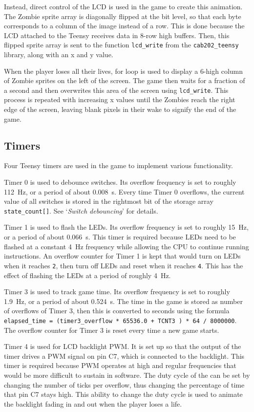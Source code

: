 \documentclass[10pt, titlepage]{article}
\begin{document}
Instead, direct control of the LCD is used in the game to create this animation. The Zombie sprite array is diagonally flipped at the bit level, so that each byte corresponds to a column of the image instead of a row. This is done because the LCD attached to the Teensy receives data in 8-row high buffers. Then, this flipped sprite array is sent to the function \texttt{lcd\_write} from the \texttt{cab202\_teensy} library, along with an x and y value.

When the player loses all their lives, for loop is used to display a 6-high column of Zombie sprites on the left of the screen. The game then waits for a fraction of a second and then overwrites this area of the screen using \texttt{lcd\_write}. This process is repeated with increasing x values until the Zombies reach the right edge of the screen, leaving blank pixels in their wake to signify the end of the game.

\subsection{Timers}
Four Teensy timers are used in the game to implement various functionality.

Timer 0 is used to debounce switches. Its overflow frequency is set to roughly \SI{112}{\Hz}, or a period of about \SI{0.008}{\s}. Every time Timer 0 overflows, the current value of all switches is stored in the rightmost bit of the storage array \texttt{state\_count[]}. See `\textit{Switch debouncing}' for details.

Timer 1 is used to flash the LEDs. Its overflow frequency is set to roughly \SI{15}{\Hz}, or a period of about \SI{0.066}{\s}. This timer is required because LEDs need to be flashed at a constant \SI{4}{\Hz} frequency while allowing the CPU to continue running instructions. An overflow counter for Timer 1 is kept that would turn on LEDs when it reaches \texttt{2}, then turn off LEDs and reset when it reaches \texttt{4}. This has the effect of flashing the LEDs at a period of roughly \SI{4}{\Hz}.

Timer 3 is used to track game time. Its overflow frequency is set to roughly \SI{1.9}{\Hz}, or a period of about \SI{0.524}{\s}. The time in the game is stored as number of overflows of Timer 3, then this is converted to seconds using the formula \texttt{elapsed\_time = (timer3\_overflow * 65536.0 + TCNT3 ) * 64  / 8000000}. The overflow counter for Timer 3 is reset every time a new game starts.

Timer 4 is used for LCD backlight PWM. It is set up so that the output of the timer drives a PWM signal on pin C7, which is connected to the backlight. This timer is required because PWM operates at high and regular frequencies that would be more difficult to sustain in software. The duty cycle of the can be set by changing the number of ticks per overflow, thus changing the percentage of time that pin C7 stays high. This ability to change the duty cycle is used to animate the backlight fading in and out when the player loses a life.
\end{document}
